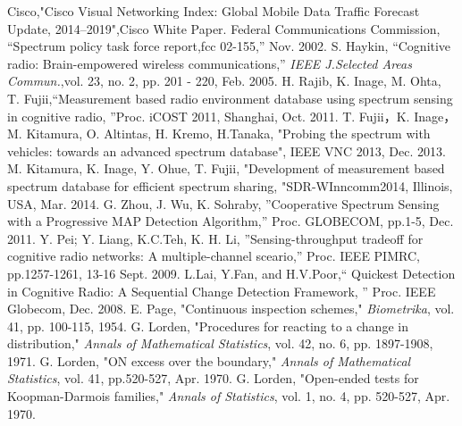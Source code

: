 \begin{thebibliography}{99}
Cisco,"Cisco Visual Networking Index: Global Mobile Data Traffic Forecast Update, 2014–2019",Cisco White Paper.
Federal Communications Commission, ``Spectrum policy task force report,fcc 02-155,'' Nov. 2002.
 S. Haykin, ``Cognitive radio: Brain-empowered wireless communications,'' {\it IEEE J.Selected Areas Commun.},vol. 23, no. 2, pp. 201 - 220, Feb. 2005.
H. Rajib, K. Inage, M. Ohta, T. Fujii,“Measurement based radio environment database using spectrum sensing in cognitive radio, ”Proc. iCOST 2011, Shanghai, Oct. 2011.
T. Fujii，K. Inage，M. Kitamura, O. Altintas, H. Kremo, H.Tanaka, "Probing the spectrum with vehicles: towards an advanced spectrum database", IEEE VNC 2013, Dec. 2013.
M. Kitamura, K. Inage, Y. Ohue, T. Fujii, "Development of measurement based spectrum database for efficient spectrum sharing, "SDR-WInncomm2014, Illinois, USA, Mar. 2014.
G. Zhou, J. Wu, K. Sohraby, ”Cooperative Spectrum Sensing with a Progressive MAP Detection Algorithm,” Proc. GLOBECOM, pp.1-5, Dec. 2011.
Y. Pei; Y. Liang, K.C.Teh, K. H. Li, ”Sensing-throughput tradeoff for cognitive radio networks: A multiple-channel sceario,” Proc. IEEE PIMRC, pp.1257-1261, 13-16 Sept. 2009.
L.Lai, Y.Fan, and H.V.Poor,“ Quickest Detection in Cognitive Radio: A Sequential Change Detection Framework, ” Proc. IEEE Globecom, Dec. 2008.
E. Page, "Continuous inspection schemes," {\it Biometrika}, vol. 41, pp. 100-115, 1954.
G. Lorden, "Procedures for reacting to a change in distribution," {\it Annals of Mathematical Statistics}, vol. 42, no. 6, pp. 1897-1908, 1971.  
G. Lorden, "ON excess over the boundary," {\it Annals of Mathematical Statistics}, vol. 41, pp.520-527, Apr. 1970.
G. Lorden, "Open-ended tests for Koopman-Darmois families," {\it Annals of Statistics}, vol. 1, no. 4, pp. 520-527, Apr. 1970.
\end{thebibliography}

